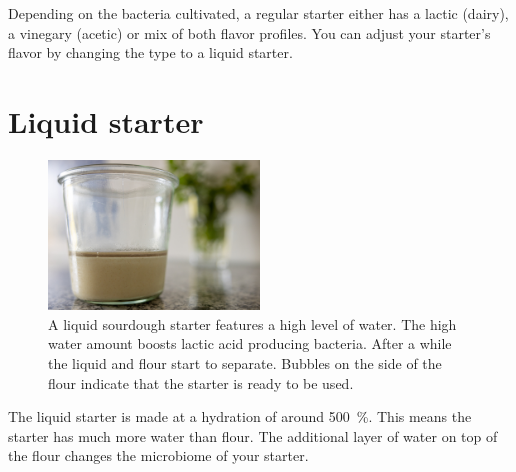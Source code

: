 Depending on the bacteria cultivated, a regular starter either has a lactic (dairy),
a vinegary (acetic) or mix of both flavor profiles. You can adjust your
starter's flavor by changing the type to a liquid starter.

\section{Liquid starter}%
\label{section:liquid-starter}

\begin{figure}[!htb]
\begin{center}
  \includegraphics[width=0.5\textwidth]{sourdough-starter-liquid.jpg}
  \caption[Liquid starter]{A liquid sourdough starter features a high level of
      water. The high water amount boosts lactic acid producing bacteria.
      After a while the liquid and flour start to separate. Bubbles on the
      side of the flour indicate that the starter is ready to be used.}%
  \label{fig:liquid-sourdough-starter}
\end{center}
\end{figure}


\begin{flowchart}[!htb]
\begin{center}
  
  \caption[Converting to a liquid starter]{The process to convert your regular
      or stiff starter into a liquid starter. The whole process takes around 
      3~days. The longer you maintain your starter at the suggested hydration
      level, the more adapted your microorganisms become. It is recommended to
      keep a backup of your original starter as the liquid environment will
      select anaerobic microorganisms. This boosts bacteria that create lactic
      acid rather than acetic acid. The resulting acidity will be perceived as
      milder.}%
  \label{flc:liquid-starter-conversion}
\end{center}
\end{flowchart}

The liquid starter is made at a hydration of around \qty{500}{\percent}. This means
the starter has much more water than flour. The additional layer of water on
top of the flour changes the microbiome of your starter.

